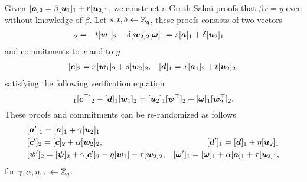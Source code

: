 
Given $[{\boldsymbol{a}}]_2 = \beta[{\boldsymbol{u}}_1]_1 + r[{\boldsymbol{u}}_2]_1$, we construct a Groth-Sahai proofs that $\beta x=y$ even without knowledge of $\beta$. Let $s,t,\delta\gets\mathbb{Z}_q$, these proofs  consists of two vectors
\begin{align}
[&\vecb{\psi}]_2=-t[\vecb{w}_1]_2-\delta[\vecb{w}_2]_2 &[\vecb{\omega}]_1 =s[\vecb{a}]_1+\delta[\vecb{u}_2]_1
\label{eq:wi-proofs}
\end{align}
and commitments to $x$ and to $y$
\begin{align*}
&[{\boldsymbol{c}}]_2= x[{\boldsymbol{w}}_1]_2+s[{\boldsymbol{w}}_2]_2, &[{\boldsymbol{d}}]_1 =x[{\boldsymbol{a}}_1]_2 + t[{\boldsymbol{u}}_2]_2,
\end{align*}
satisfying the following verification equation
\begin{equation}
[\vecb{a}]_1[\vecb{c}^\top]_2-[\vecb{d}]_1[\vecb{w}_1]_2 =[\vecb{u}_2]_1[\vecb{\psi}^\top]_2+[\vecb{\omega}]_1[\vecb{w}^\top_2]_2.
\label{eq:wi-verif}
\end{equation}
These proofs and commitments can be re-randomized as follows
\begin{align}
&[{\boldsymbol{a}}']_1 = [{\boldsymbol{a}}]_1 + \gamma[{\boldsymbol{u}}_2]_1 \nonumber\\
&[{\boldsymbol{c}}']_2= [{\boldsymbol{c}}]_2 + \alpha[{\boldsymbol{w}}_2]_2, &[{\boldsymbol{d}}']_1 =[{\boldsymbol{d}}]_1 + \eta[{\boldsymbol{u}}_2]_1 \nonumber\\
&[{\boldsymbol{\psi}}']_2=[{\boldsymbol{\psi}}]_2+\gamma[{\boldsymbol{c}}']_2 - \eta[{\boldsymbol{w}}_1]-\tau[{\boldsymbol{w}}_2]_2, & [{\boldsymbol{\omega}}']_1 = [{\boldsymbol{\omega}}]_1 + \alpha[{\boldsymbol{a}}]_1+\tau[{\boldsymbol{u}}_2]_1,
\label{eq:wi-rerand}
\end{align}
for $\gamma,\alpha,\eta,\tau\gets\mathbb{Z}_q$.


